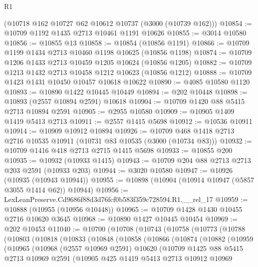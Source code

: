\begin{lexlean}{R1}
\begin{coremodule}
    (@10718 @162 @10727 @62 @10612 @10737 (@3000 (@10739 @162)))
@10854 := @10709 @1192 @1435 @2713 @10461 @1191 @10626
@10855 := @3014 @10580
@10856 := @10855 @13
@10858 := @10854 (@10856 @1191)
@10866 := @10709 @1199 @1434 @2713 @10460 @1198 @10625 (@10856 @1198)
@10874 := @10709 @1206 @1433 @2713 @10459 @1205 @10624 (@10856 @1205)
@10882 := @10709 @1213 @1432 @2713 @10458 @1212 @10623 (@10856 @1212)
@10888 := @10709 @1423 @1431 @10450 @10457 @10618 @10622
@10890 := @4085 @10580 @1120
@10893 := @10890 @1422 @10445 @10449
@10894 := @202 @10448
@10898 := @10893 (@2557 @10894 @2591) @10618
@10904 := @10709 @1420 @88 @5415 @2713 @10894 @2591
@10905 := @2955 @10580
@10909 := @10905 @1409 @1419 @5413 @2713
@10911 := @2557 @1415 @5698
@10912 := @10536 @10911
@10914 := @10909 @10912 @10894
@10926 := @10709 @468 @1418 @2713 @2716 @10535 @10911 (@10731 @83 @10535 (@3000 (@10734 @83)))
@10932 := @10709 @1416 @418 @2713 @2715 @1415 @5698
@10933 := @10855 @200
@10935 := @10932 (@10933 @1415)
@10943 := @10709 @204 @88 @2713 @2713 @203 @2591 (@10933 @203)
@10944 := @3020 @10580
@10947 := @10926 (@10935 (@10943 @10944))
@10955 := @10898 (@10904 (@10914 @10947 (@5857 @3055 @1414 @62)) @10944)
@10956 := LexLeanPreserve.Cd9686f88d3d76fcf0b583f359c728594.R1.__rel_17
@10959 := @10888 (@10955 (@10956 @10448))
@10965 := @10709 @1428 @1430 @10455 @2716 @10620 @3645
@10968 := @10890 @1427 @10445 @10454
@10969 := @202 @10453
@11040 := @10700
    (@10708
      (@10743
        (@10758
          (@10773
            (@10788
              (@10803
                (@10818
                  (@10833
                    (@10848
                      (@10858
                        (@10866
                          (@10874
                            (@10882
                              (@10959
                                (@10965
                                  (@10968
                                    (@2557 @10969 @2591)
                                    @10620
                                    (@10709
                                      @1425
                                      @88
                                      @5415
                                      @2713
                                      @10969
                                      @2591
                                      (@10905
                                        @425
                                        @1419
                                        @5413
                                        @2713
                                        @10912
                                        @10969

\end{coremodule}
\end{lexlean}
